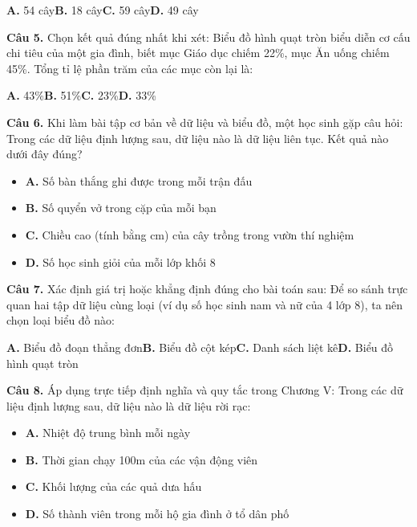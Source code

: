 \documentclass[11pt,a4paper]{article}
\begin{document}
\hspace*{1.5em}\textbf{A.} 54 cây\quad\quad \textbf{B.} 18 cây\quad\quad \textbf{C.} 59 cây\quad\quad \textbf{D.} 49 cây\par\vspace{2pt}
\textbf{\color{primary} Câu 5.} Chọn kết quả đúng nhất khi xét: Biểu đồ hình quạt tròn biểu diễn cơ cấu chi tiêu của một gia đình, biết mục Giáo dục chiếm 22\%, mục Ăn uống chiếm 45\%. Tổng tỉ lệ phần trăm của các mục còn lại là:\par
\hspace*{1.5em}\textbf{A.} 43\%\quad\quad \textbf{B.} 51\%\quad\quad \textbf{C.} 23\%\quad\quad \textbf{D.} 33\%\par\vspace{2pt}
\textbf{\color{primary} Câu 6.} Khi làm bài tập cơ bản về dữ liệu và biểu đồ, một học sinh gặp câu hỏi: Trong các dữ liệu định lượng sau, dữ liệu nào là dữ liệu liên tục. Kết quả nào dưới đây đúng?\par
\begin{itemize}\setlength{\itemsep}{1pt}\setlength{\parskip}{0pt}
  \item[] \textbf{A.} Số bàn thắng ghi được trong mỗi trận đấu
  \item[] \textbf{B.} Số quyển vở trong cặp của mỗi bạn
  \item[] \textbf{C.} Chiều cao (tính bằng cm) của cây trồng trong vườn thí nghiệm
  \item[] \textbf{D.} Số học sinh giỏi của mỗi lớp khối 8
\end{itemize}\vspace{2pt}
\textbf{\color{primary} Câu 7.} Xác định giá trị hoặc khẳng định đúng cho bài toán sau: Để so sánh trực quan hai tập dữ liệu cùng loại (ví dụ số học sinh nam và nữ của 4 lớp 8), ta nên chọn loại biểu đồ nào:\par
\hspace*{1.5em}\textbf{A.} Biểu đồ đoạn thẳng đơn\quad\quad \textbf{B.} Biểu đồ cột kép\quad\quad \textbf{C.} Danh sách liệt kê\quad\quad \textbf{D.} Biểu đồ hình quạt tròn\par\vspace{2pt}
\textbf{\color{primary} Câu 8.} Áp dụng trực tiếp định nghĩa và quy tắc trong Chương V: Trong các dữ liệu định lượng sau, dữ liệu nào là dữ liệu rời rạc:\par
\begin{itemize}\setlength{\itemsep}{1pt}\setlength{\parskip}{0pt}
  \item[] \textbf{A.} Nhiệt độ trung bình mỗi ngày
  \item[] \textbf{B.} Thời gian chạy 100m của các vận động viên
  \item[] \textbf{C.} Khối lượng của các quả dưa hấu
  \item[] \textbf{D.} Số thành viên trong mỗi hộ gia đình ở tổ dân phố
\end{itemize}\vspace{2pt}
\end{document}
